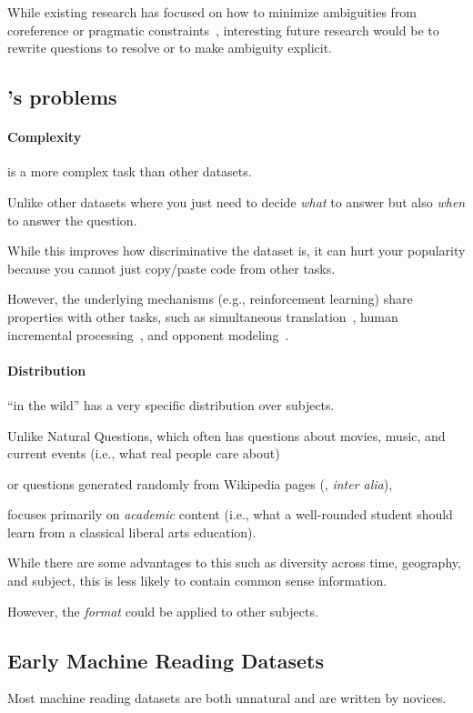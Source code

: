 While existing research has focused on how to minimize ambiguities from coreference or pragmatic constraints~\cite{elgohary-19}, interesting future research would be to rewrite questions to resolve or to make ambiguity explicit.



\subsection{\qb{}'s problems}

\paragraph{Complexity} 

\qb{} is a more complex task than other datasets.  

Unlike other datasets where you just need to decide \emph{what} to answer but also \emph{when} to answer the question.

While this improves how discriminative the dataset is, it can hurt your popularity because you cannot just copy/paste code from other  tasks.

However, the underlying mechanisms (e.g., reinforcement learning) share properties with other tasks, such as simultaneous translation~\cite{grissom:he:boyd-graber:morgan-2014,ma-etal-2019-stacl}, human incremental processing~\cite{levy-08,levy-11}, and opponent modeling~\cite{he-16}.


\paragraph{Distribution} 

\qb{} ``in the wild'' has a very specific distribution over subjects.

Unlike Natural Questions, which often has questions about movies, music, and current events (i.e., what real people care about)

or questions generated randomly from Wikipedia pages (\squad{}, \textit{inter alia}),

\qb{} focuses primarily on \emph{academic} content (i.e., what a well-rounded student should learn from a classical liberal arts education).

While there are some advantages to this such as diversity across time, geography, and subject, this is less likely to contain common sense information.

However, the \qb{} \emph{format} could be applied to other subjects.


\subsection{Early Machine Reading Datasets}

Most machine reading datasets are both unnatural and are written by novices.